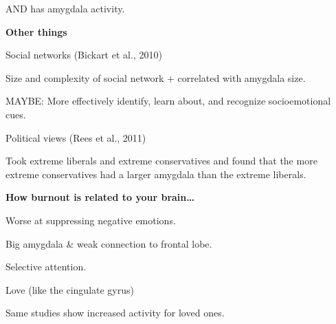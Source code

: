 \begin{coloredlist}
\begin{coloredlist}
\begin{coloredlist}
\begin{coloredlist}
\begin{coloredlist}
                    \item AND has amygdala activity.
                \end{coloredlist}
                \item \textbf{Other things}
                \begin{coloredlist}
                    \item Social networks (Bickart et al., 2010)
                    \begin{coloredlist}
                        \item Size and complexity of social network + correlated with amygdala size.
                        \item MAYBE: More effectively identify, learn about, and recognize socioemotional cues.
                    \end{coloredlist}
                    \item Political views (Rees et al., 2011)
                    \begin{coloredlist}
                        \item Took extreme liberals and extreme conservatives and found that the more extreme conservatives had a larger amygdala than the extreme liberals.
                    \end{coloredlist}
                \end{coloredlist}
                \item \textbf{How burnout is related to your brain\ldots}
                \begin{coloredlist}
                    \item Worse at suppressing negative emotions.
                    \item Big amygdala \& weak connection to frontal lobe.
                \end{coloredlist}
            \end{coloredlist}
        \end{coloredlist}
        \item {}
        \begin{coloredlist}
            \item Selective attention.
            \item Love (like the cingulate gyrus)
            \begin{coloredlist}
                \item Same studies show increased activity for loved ones.
            \end{coloredlist}

\end{coloredlist}
\end{coloredlist}
\end{coloredlist}
